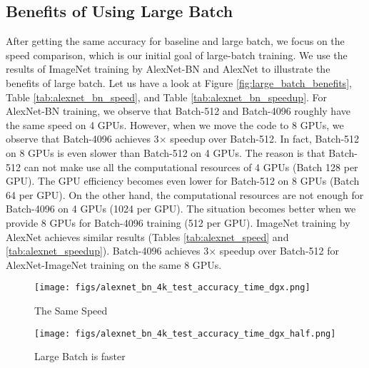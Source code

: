 \documentclass{article} %
\begin{document}


%



\iffalse

\subsection{Benefits of Using Large Batch}
After getting the same accuracy for baseline and large batch, we focus on the speed comparison, which is our initial goal of large-batch training. 
We use the results of ImageNet training by AlexNet-BN and AlexNet to illustrate the benefits of large batch.
Let us have a look at Figure \ref{fig:large_batch_benefits}, Table \ref{tab:alexnet_bn_speed}, and Table \ref{tab:alexnet_bn_speedup}.
For AlexNet-BN training, we observe that Batch-512 and Batch-4096 roughly have the same speed on 4 GPUs. However, when we move the code to 8 GPUs, we observe that Batch-4096 achieves 3$\times$ speedup over Batch-512. 
In fact, Batch-512 on 8 GPUs is even slower than Batch-512 on 4 GPUs. The reason is that Batch-512 can not make use all the computational resources of 4 GPUs (Batch 128 per GPU). The GPU efficiency becomes even lower for Batch-512 on 8 GPUs (Batch 64 per GPU). 
On the other hand, the computational resources are not enough for Batch-4096 on 4 GPUs (1024 per GPU). The situation becomes better when we provide 8 GPUs for Batch-4096 training (512 per GPU).
ImageNet training by AlexNet achieves similar results (Tables \ref{tab:alexnet_speed} and \ref{tab:alexnet_speedup}).
Batch-4096 achieves 3$\times$ speedup over Batch-512 for AlexNet-ImageNet training on the same 8 GPUs.

\begin{figure*}
    \begin{subfigure}[b]{0.5\textwidth}
        \centering
        \texttt{[image: figs/alexnet\_bn\_4k\_test\_accuracy\_time\_dgx.png]}
        \caption{The Same Speed}
    \end{subfigure}%
    \begin{subfigure}[b]{0.5\textwidth}
        \centering
        \texttt{[image: figs/alexnet\_bn\_4k\_test\_accuracy\_time\_dgx\_half.png]}
        \caption{Large Batch is faster}
    \end{subfigure}
    \caption{On DGX-half (4 GPUs), Batch 512 has the same speed with Batch 4096. On DGX (8 GPUs), Batch 4096 is 2.6$\times$ faster than Batch 512. Thus, large batch size can benefit from computational power enhancement. \label{fig:large_batch_benefits}}
\end{figure*}
\end{document}
